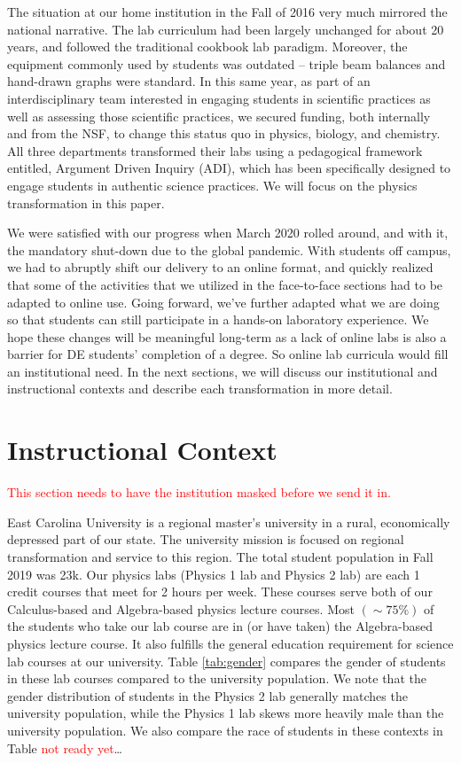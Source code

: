 \documentclass[aip, numerical, preprint]{revtex4-2}
\begin{document}
The situation at our home institution in the Fall of 2016 very much mirrored the national
narrative.  The lab curriculum had been largely unchanged for about 20 years, and followed the
traditional cookbook lab paradigm.  Moreover, the equipment commonly used by students was
outdated -- triple beam balances and hand-drawn graphs were standard.  In this same year, as
part of an interdisciplinary team interested in engaging students in scientific practices as
well as assessing those scientific practices, we secured funding, both internally and from the
NSF, to change this status quo in physics, biology, and chemistry.  All three departments
transformed their labs using a pedagogical framework entitled, Argument Driven Inquiry
(ADI),\cite{Sampson2011,Walker2011,Walker2016} which has been specifically designed to engage
students in authentic science practices. We will focus on the physics transformation in this
paper.

We were satisfied with our progress when March 2020 rolled around, and with it, the mandatory
shut-down due to the global pandemic.  With students off campus, we had to abruptly shift our
delivery to an online format, and quickly realized that some of the activities that we utilized
in the face-to-face sections had to be adapted to online use.  Going forward, we've further
adapted what we are doing so that students can still participate in a hands-on laboratory
experience.  We hope these changes will be meaningful long-term as a lack of online labs is
also a barrier for DE students' completion of a degree.  So online lab curricula would fill an
institutional need.  In the next sections, we will discuss our institutional and instructional
contexts and describe each transformation in more detail.

\section{Instructional Context}
\textcolor{red}{This section needs to have the institution masked before we send it in.}

East Carolina University is a regional master's university in a rural, economically depressed
part of our state.  The university mission is focused on regional transformation and service to
this region.  The total student population in Fall 2019 was 23k.  Our physics labs (Physics 1
lab and Physics 2 lab) are each 1 credit courses that meet for 2 hours per week. These courses
serve both of our Calculus-based and Algebra-based physics lecture courses.  Most $(\sim 75\%)$
of the students who take our lab course are in (or have taken) the Algebra-based physics
lecture course. It also fulfills the general education requirement for science lab courses at
our university.  Table \ref{tab:gender} compares the gender of students in these lab courses
compared to the university population.  We note that the gender distribution of students in the
Physics 2 lab generally matches the university population, while the Physics 1 lab skews more
heavily male than the university population.  We also compare the race of students in these
contexts in Table \textcolor{red}{not ready yet}\ldots
\end{document}
